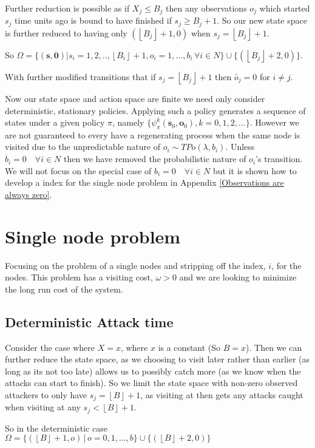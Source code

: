 \documentclass[a4paper,10pt]{article}
\newcommand{\floor}[1]{\left \lfloor #1 \right \rfloor}
\theoremstyle{definition}
\theoremstyle{definition}
\theoremstyle{remark}
\theoremstyle{definition}
\begin{document}
Further reduction is possible as if $X_{j} \leq B_{j}$ then any observations $o_{j}$ which started $s_{j}$ time units ago is bound to have finished if $s_{j} \geq B_{j}+1$. So our new state space is further reduced to having only $(\floor{B_{j}}+1,0)$ when $s_{j}=\floor{B_{j}}+1$.

So $\Omega= \{ (\bm{s},\bm{0}) | s_{i}=1,2,..,\floor{B_{i}}+1 , o_{i}=1,...,b_{i} \, \forall i \in N \} \cup \{(\floor{B_{j}}+2,0) \}$.

With further modified transitions that if $s_{j}=\floor{B_{j}}+1$ then $\widetilde{o_{j}}=0$ for $i \neq j$. 

Now our state space and action space are finite we need only consider deterministic, stationary policies. Applying such a policy generates a sequence of states under a given policy $\pi$, namely $\{\psi_{\pi}^{k}(\bm{s}_{0},\bm{o}_{0}), k=0,1,2,... \}$. However we are not guaranteed to every have a regenerating process when the same node is visited due to the unpredictable nature of $o_{i} \sim TPo(\lambda,b_{i})$. Unless $b_{i}=0 \quad \forall i \in N$ then we have removed the probabilistic nature of $o_{i}$'s transition. We will not focus on the special case of $b_{i}=0 \quad \forall i \in N$ but it is shown how to develop a index for the single node problem in Appendix \ref{Observations are always zero}.

\section{Single node problem}
Focusing on the problem of a single nodes and stripping off the index, $i$, for the nodes. This problem has a visiting cost, $\omega>0$ and we are looking to minimize the long run cost of the system.

\subsection{Deterministic Attack time}
Consider the case where $X=x$, where $x$ is a constant (So $B=x$). Then we can further reduce the state space, as we choosing to visit later rather than earlier (as long as its not too late) allows us to possibly catch more (as we know when the attacks can start to finish). So we limit the state space with non-zero observed attackers to only have $s_{j}=\floor{B}+1$, as visiting at then gets any attacks caught when visiting at any $s_{j} < \floor{B}+1$.

So in the deterministic case $\Omega= \{(\floor{B}+1,o) \, | \, o=0,1,...,b \} \cup \{(\floor{B}+2,0) \}$
\end{document}
